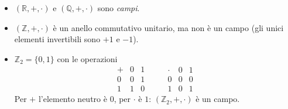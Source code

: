 \documentclass[11pt,a4paper]{article}
\begin{document}
\begin{esempio}
\begin{itemize}
  \item $(\mathbb{R}, +, \cdot)$ e $(\mathbb{Q}, +, \cdot)$ sono \emph{campi}.
  \item $(\mathbb{Z}, +, \cdot)$ è un anello commutativo unitario, ma non è un campo (gli unici elementi invertibili sono $+1$ e $-1$).
  \item $\mathbb{Z}_2 = \{0, 1\}$ con le operazioni
  \[
  \begin{array}{c|cc}
    + & 0 & 1 \\ \hline
    0 & 0 & 1 \\
    1 & 1 & 0
  \end{array}
  \qquad
  \begin{array}{c|cc}
    \cdot & 0 & 1 \\ \hline
    0 & 0 & 0 \\
    1 & 0 & 1
  \end{array}
  \]
  Per $+$ l'elemento neutro è $0$, per $\cdot$ è $1$: $(\mathbb{Z}_2, +, \cdot)$ è un campo.
\end{itemize}
\end{esempio}
\end{document}
